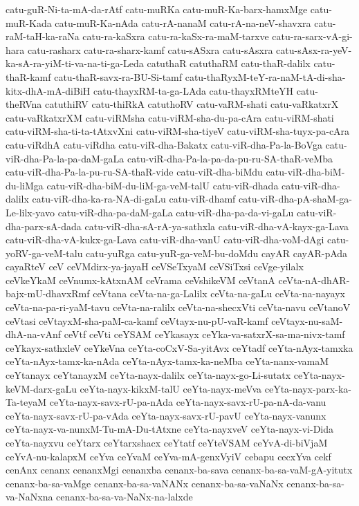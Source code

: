 {catu-guR-Ni-ta-mA-da-rAtf
catu-muRKa
catu-muR-Ka-barx-hamxMge
catu-muR-Kada
catu-muR-Ka-nAda
catu-rA-nanaM
catu-rA-na-neV-shavxra
catu-raM-taH-ka-raNa
catu-ra-kaSxra
catu-ra-kaSx-ra-maM-tarxve
catu-ra-sarx-vA-gi-hara
catu-rasharx
catu-ra-sharx-kamf
catu-sASxra
catu-sAsxra
catu-sAsx-ra-yeV-ka-sA-ra-yiM-ti-va-na-ti-ga-Leda
catuthaR
catuthaRM
catu-thaR-dalilx
catu-thaR-kamf
catu-thaR-savx-ra-BU-Si-tamf
catu-thaRyxM-teY-ra-naM-tA-di-sha-kitx-dhA-mA-diBiH
catu-thayxRM-ta-ga-LAda
catu-thayxRMteYH
catu-theRVna
catuthiRV
catu-thiRkA
catuthoRV
catu-vaRM-shati
catu-vaRkatxrX
catu-vaRkatxrXM
catu-viRMsha
catu-viRM-sha-du-pa-cAra
catu-viRM-shati
catu-viRM-sha-ti-ta-tAtxvXni
catu-viRM-sha-tiyeV
catu-viRM-sha-tuyx-pa-cAra
catu-viRdhA
catu-viRdha
catu-viR-dha-Bakatx
catu-viR-dha-Pa-la-BoVga
catu-viR-dha-Pa-la-pa-daM-gaLa
catu-viR-dha-Pa-la-pa-da-pu-ru-SA-thaR-veMba
catu-viR-dha-Pa-la-pu-ru-SA-thaR-vide
catu-viR-dha-biMdu
catu-viR-dha-biM-du-liMga
catu-viR-dha-biM-du-liM-ga-veM-talU
catu-viR-dhada
catu-viR-dha-dalilx
catu-viR-dha-ka-ra-NA-di-gaLu
catu-viR-dhamf
catu-viR-dha-pA-shaM-ga-Le-lilx-yavo
catu-viR-dha-pa-daM-gaLa
catu-viR-dha-pa-da-vi-gaLu
catu-viR-dha-parx-sA-dada
catu-viR-dha-sA-rA-ya-sathxla
catu-viR-dha-vA-kayx-ga-Lava
catu-viR-dha-vA-kukx-ga-Lava
catu-viR-dha-vanU
catu-viR-dha-voM-dAgi
catu-yoRV-ga-veM-talu
catu-yuRga
catu-yuR-ga-veM-bu-doMdu
cayAR
cayAR-pAda
cayaRteV
ceV
ceVMdirx-ya-jayaH
ceVSeTxyaM
ceVSiTxsi
ceVge-yilalx
ceVkeYkaM
ceVnumx-kAtxnAM
ceVrama
ceVshikeVM
ceVtanA
ceVta-nA-dhAR-bajx-mU-dhavxRmf
ceVtana
ceVta-na-ga-Lalilx
ceVta-na-gaLu
ceVta-na-nayayx
ceVta-na-pa-ri-yaM-tavu
ceVta-na-ralilx
ceVta-na-shecxVti
ceVta-navu
ceVtanoV
ceVtasi
ceVtayxM-sha-paM-ca-kamf
ceVtayx-nu-pU-vaR-kamf
ceVtayx-nu-saM-dhA-na-vAnf
ceVtf
ceVti
ceYSAM
ceYkasayx
ceYka-va-satxrX-sa-ma-nivx-tamf
ceYkayx-sathxleV
ceYkeVna
ceYta-coCxV-Sa-yitAvx
ceYtadf
ceYta-nAyx-tamxka
ceYta-nAyx-tamx-ka-nAda
ceYta-nAyx-tamx-ka-neMba
ceYta-nanx-vamaM
ceYtanayx
ceYtanayxM
ceYta-nayx-dalilx
ceYta-nayx-go-Li-sutatx
ceYta-nayx-keVM-darx-gaLu
ceYta-nayx-kikxM-talU
ceYta-nayx-meVva
ceYta-nayx-parx-ka-Ta-teyaM
ceYta-nayx-savx-rU-pa-nAda
ceYta-nayx-savx-rU-pa-nA-da-vanu
ceYta-nayx-savx-rU-pa-vAda
ceYta-nayx-savx-rU-pavU
ceYta-nayx-vanunx
ceYta-nayx-va-nunxM-Tu-mA-Du-tAtxne
ceYta-nayxveV
ceYta-nayx-vi-Dida
ceYta-nayxvu
ceYtarx
ceYtarxshacx
ceYtatf
ceYteVSAM
ceYvA-di-biVjaM
ceYvA-nu-kalapxM
ceYva
ceYvaM
ceYva-mA-genxVyiV
cebapu
cecxYva
cekf
cenAnx
cenanx
cenanxMgi
cenanxba
cenanx-ba-sava
cenanx-ba-sa-vaM-gA-yitutx
cenanx-ba-sa-vaMge
cenanx-ba-sa-vaNANx
cenanx-ba-sa-vaNaNx
cenanx-ba-sa-va-NaNxna
cenanx-ba-sa-va-NaNx-na-lalxde
}
